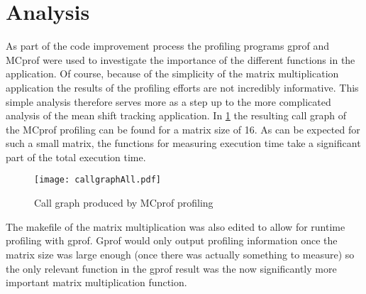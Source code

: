 \documentclass[final]{article}
\begin{document}
\section{Analysis}
As part of the code improvement process the profiling programs gprof and MCprof were used to investigate the importance of the different functions in the application. Of course, because of the simplicity of the matrix multiplication application the results of the profiling efforts are not incredibly informative. This simple analysis therefore serves more as a step up to the more complicated analysis of the mean shift tracking application. In \cref{fig:callgraphall} the resulting call graph of the MCprof profiling can be found for a matrix size of 16. As can be expected for such a small matrix, the functions for measuring execution time take a significant part of the total execution time.
\begin{figure}[H]
\centering
\texttt{[image: callgraphAll.pdf]}
\caption{Call graph produced by MCprof profiling \cite{pdfthesisAshraf}}
\label{fig:callgraphall}
\end{figure}
The makefile of the matrix multiplication was also edited to allow for runtime profiling with gprof. Gprof would only output profiling information once the matrix size was large enough (once there was actually something to measure) so the only relevant function in the gprof result was the now significantly more important matrix multiplication function.
\end{document}
